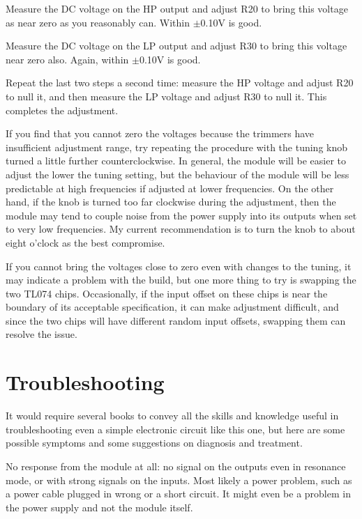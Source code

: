 Measure the DC voltage on the HP output and adjust R20 to bring this voltage
as near zero as you reasonably can.  Within $\pm$0.10V is good.

Measure the DC voltage on the LP output and adjust R30 to bring this voltage
near zero also.  Again, within $\pm$0.10V is good.

Repeat the last two steps a second time:  measure the HP voltage and adjust
R20 to null it, and then measure the LP voltage and adjust R30 to null it.
This completes the adjustment.

If you find that you cannot zero the voltages because the trimmers have
insufficient adjustment range, try repeating the procedure with the tuning
knob turned a little further counterclockwise.  In general, the module will
be easier to adjust the lower the tuning setting, but the behaviour of the
module will be less predictable at high frequencies if adjusted at lower
frequencies.  On the other hand, if the knob is turned too far clockwise
during the adjustment, then the module may tend to couple noise from the
power supply into its outputs when set to very low frequencies.  My current
recommendation is to turn the knob to about eight o'clock as the best
compromise.

If you cannot bring the voltages close to zero even with changes to the
tuning, it may indicate a problem with the build, but one more thing to try
is swapping the two TL074 chips.  Occasionally, if the input offset on these
chips is near the boundary of its acceptable specification, it can make
adjustment difficult, and since the two chips will have different random
input offsets, swapping them can resolve the issue.

\section{Troubleshooting}

It would require several books to convey all the skills and knowledge useful
in troubleshooting even a simple electronic circuit like this one, but here
are some possible symptoms and some suggestions on diagnosis and treatment.

No response from the module at all:  no signal on the outputs even in
resonance mode, or with strong signals on the inputs.  Most likely a power
problem, such as a power cable plugged in wrong or a short circuit.  It
might even be a problem in the power supply and not the module itself.

